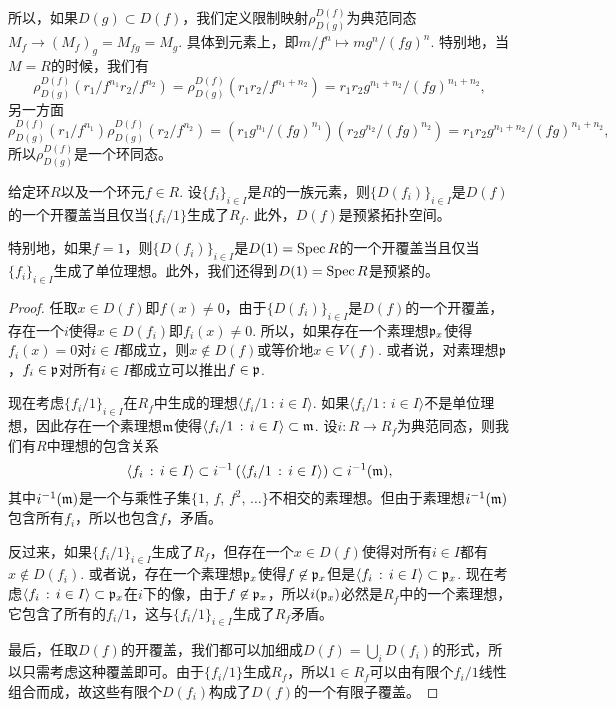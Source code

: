 所以，如果$D(g)\subset D(f)$，我们定义限制映射$\rho^{D(f)}_{D(g)}$为典范同态$M_f\to (M_f)_g=M_{fg}=M_g$. 具体到元素上，即$m/f^n\mapsto mg^n/(fg)^n$. 特别地，当$M=R$的时候，我们有
\[
	\rho^{D(f)}_{D(g)}(r_1/f^{n_1} r_2/f^{n_2})=\rho^{D(f)}_{D(g)}(r_1r_2/f^{n_1+n_2})=r_1r_2 g^{n_1+n_2}/(fg)^{n_1+n_2},
\]
另一方面
\[
	\rho^{D(f)}_{D(g)}(r_1/f^{n_1})\rho^{D(f)}_{D(g)}(r_2/f^{n_2})=(r_1g^{n_1}/(fg)^{n_1})(r_2g^{n_2}/(fg)^{n_2})=r_1r_2 g^{n_1+n_2}/(fg)^{n_1+n_2},
\]
所以$\rho^{D(f)}_{D(g)}$是一个环同态。

\begin{lem}\label{lem:3.12}
给定环$R$以及一个环元$f\in R$. 设$\{f_i\}_{i\in I}$是$R$的一族元素，则$\{D(f_i)\}_{i\in I}$是$D(f)$的一个开覆盖当且仅当$\{f_i/1\}$生成了$R_f$. 此外，$D(f)$是预紧拓扑空间。
\end{lem}

特别地，如果$f=1$，则$\{D(f_i)\}_{i\in I}$是$D(1)=\operatorname{Spec} R$的一个开覆盖当且仅当$\{f_i\}_{i\in I}$生成了单位理想。此外，我们还得到$D(1)=\operatorname{Spec} R$是预紧的。

\begin{proof}
任取$x\in D(f)$即$f(x)\neq 0$，由于$\{D(f_i)\}_{i\in I}$是$D(f)$的一个开覆盖，存在一个$i$使得$x\in D(f_i)$即$f_i(x)\neq 0$. 所以，如果存在一个素理想$\mathfrak{p}_x$使得$f_i(x)=0$对$i\in I$都成立，则$x\not\in D(f)$或等价地$x\in V(f)$. 或者说，对素理想$\mathfrak{p}$，$f_i\in \mathfrak{p}$对所有$i\in I$都成立可以推出$f\in \mathfrak{p}$.

现在考虑$\{f_i/1\}_{i \in I}$在$R_f$中生成的理想$\langle f_i/1\,:\,i \in I \rangle$. 如果$\langle f_i/1\,:\,i \in I \rangle$不是单位理想，因此存在一个素理想$\mathfrak{m}$使得$\langle f_i/1\,:\,i \in I \rangle\subset \mathfrak{m}$. 设$i:R\to R_f$为典范同态，则我们有$R$中理想的包含关系
\[
	\langle f_i\,:\,i \in I \rangle \subset i^{-1}\left(\langle f_i/1\,:\,i \in I \rangle\right)\subset i^{-1}(\mathfrak{m}),
\]
其中$i^{-1}(\mathfrak{m})$是一个与乘性子集$\{1$, $f$, $f^2$, $\dots\}$不相交的素理想。但由于素理想$i^{-1}(\mathfrak{m})$包含所有$f_i$，所以也包含$f$，矛盾。

反过来，如果$\{f_i/1\}_{i \in I}$生成了$R_f$，但存在一个$x\in D(f)$使得对所有$i\in I$都有$x\not\in D(f_i)$. 或者说，存在一个素理想$\mathfrak{p}_x$使得$f\not\in \mathfrak{p}_x$但是$\langle f_i\,:\,i \in I \rangle\subset \mathfrak{p}_x$. 现在考虑$\langle f_i\,:\,i \in I \rangle\subset \mathfrak{p}_x$在$i$下的像，由于$f\not\in \mathfrak{p}_x$，所以$i(\mathfrak{p}_x)$必然是$R_f$中的一个素理想，它包含了所有的$f_i/1$，这与$\{f_i/1\}_{i \in I}$生成了$R_f$矛盾。

最后，任取$D(f)$的开覆盖，我们都可以加细成$D(f)=\bigcup_i D(f_i)$的形式，所以只需考虑这种覆盖即可。由于$\{f_i/1\}$生成$R_f$，所以$1\in R_f$可以由有限个$f_i/1$线性组合而成，故这些有限个$D(f_i)$构成了$D(f)$的一个有限子覆盖。
\end{proof}

